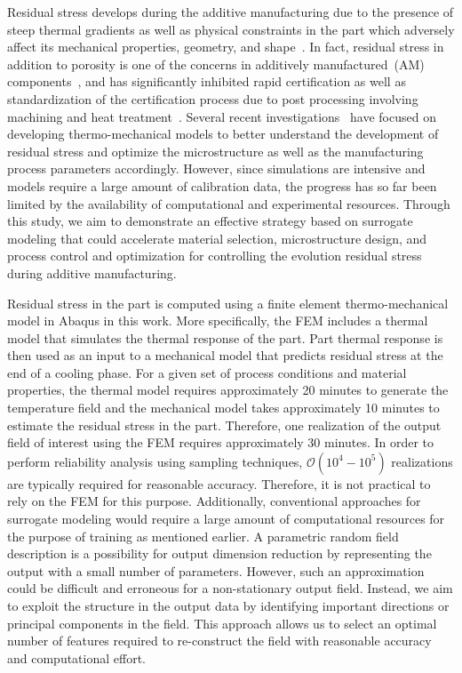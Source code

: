 Residual stress develops during the additive manufacturing due to the presence of steep thermal gradients as
well as physical constraints in the part which adversely affect its mechanical properties, geometry, and 
shape~\cite{Withers:2001,Mercelis:2006,Hofmann:2014}. 
In fact, residual stress in addition to porosity is one of the concerns in
additively manufactured~(AM) components~\cite{Kim:2018}, and has significantly 
inhibited rapid certification as well as standardization of the certification process
due to post processing involving machining and heat treatment~\cite{Shiomi:2004}.
Several recent investigations~\cite{Vastola:2016,Hodge:2016,Williams:2018}
have focused on developing thermo-mechanical
models to better understand the development of residual stress and optimize the microstructure as well as
the manufacturing process parameters accordingly. However, since simulations are intensive and models require a 
large amount of calibration data, the progress has so far been limited by the availability
of computational and experimental resources. Through this study, we aim to demonstrate an effective strategy
based on surrogate modeling that could accelerate material selection, microstructure design, and
process control and optimization for controlling the evolution residual stress during additive manufacturing. 

Residual stress in the part is computed using a finite element thermo-mechanical model in Abaqus in this work. 
More specifically, the FEM includes a thermal model that simulates the thermal response of the
part. Part thermal response is then used as an input to a mechanical model that predicts residual stress at the end
of a cooling phase. For a given set of process conditions and material properties, the thermal model requires
approximately 20 minutes to generate the temperature field and the mechanical model takes approximately 10
minutes to estimate the residual stress in the part. Therefore, one realization of the output field of interest
using the FEM requires approximately 30 minutes. In order to perform reliability analysis using
sampling techniques, $\mathcal{O}(10^4-10^5)$ realizations are typically required for reasonable accuracy.  
Therefore, it is not practical
to rely on the FEM for this purpose. Additionally, conventional approaches for surrogate
modeling would require a large amount of computational resources for the purpose of training as mentioned earlier.
 A parametric random field description is a possibility for
output dimension reduction by representing the output with a small number of parameters. 
However, such an approximation could be difficult and erroneous for a non-stationary
output field. Instead, we aim to exploit the structure in the output data 
by identifying important 
directions or principal components in the field. This approach allows us to select an optimal number of 
features required to re-construct the field with reasonable accuracy and computational effort. 

